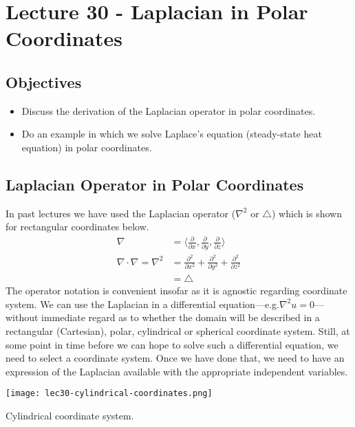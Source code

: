 \chapter{Lecture 30 - Laplacian in Polar Coordinates}
\label{ch:lec30}
\section{Objectives}
\begin{itemize}
\item Discuss the derivation of the Laplacian operator in polar coordinates.
\item Do an example in which we solve Laplace's equation (steady-state heat equation) in polar coordinates.
\end{itemize}
\setcounter{lstannotation}{0}

\section{Laplacian Operator in Polar Coordinates}

In past lectures we have used the Laplacian operator ($\nabla^2$ or $\bigtriangleup$) which is shown for rectangular coordinates below.
\begin{align*}
\nabla &= \langle \frac{\partial}{\partial x}, \frac{\partial}{\partial y}, \frac{\partial}{\partial z} \rangle \\
\nabla \cdot \nabla = \nabla^2 &= \frac{\partial^2}{\partial x^2} + \frac{\partial^2}{\partial y^2} + \frac{\partial^2}{\partial z^2} \\
&= \bigtriangleup
\end{align*}
The operator notation is convenient insofar as it is agnostic regarding coordinate system.  We can use the Laplacian in a differential equation---e.g.$\nabla^2u = 0$---without immediate regard as to whether the domain will be described in a rectangular (Cartesian), polar, cylindrical or spherical coordinate system.  Still, at some point in time before we can hope to solve such a differential equation, we need to select a coordinate system.  Once we have done that, we need to have an expression of the Laplacian available with the appropriate independent variables.  
\begin{marginfigure}
\texttt{[image: lec30-cylindrical-coordinates.png]}
\caption{Cylindrical coordinate system.}
\label{fig:lec30-cylindrical-coordinates}
\end{marginfigure}

